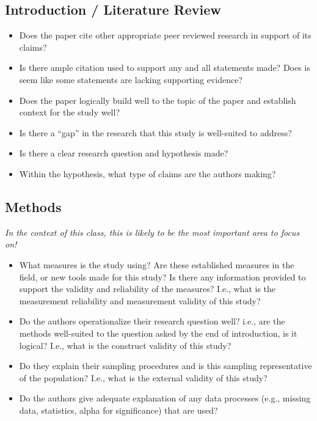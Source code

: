 \documentclass[
  12pt,
  letterpaper,
]{scrartcl}
\begin{document}
\subsection{Introduction / Literature
Review}\label{introduction-literature-review}

\begin{itemize}
\item
  Does the paper cite other appropriate peer reviewed research in
  support of its claims?
\item
  Is there ample citation used to support any and all statements made?
  Does is seem like some statements are lacking supporting evidence?
\item
  Does the paper logically build well to the topic of the paper and
  establish context for the study well?
\item
  Is there a ``gap'' in the research that this study is well-suited to
  address?
\item
  Is there a clear research question and hypothesis made?
\item
  Within the hypothesis, what type of claims are the authors making?
\end{itemize}

\subsection{Methods}\label{methods}

\emph{In the context of this class, this is likely to be the most
important area to focus on!}

\begin{itemize}
\item
  What measures is the study using? Are these established measures in
  the field, or new tools made for this study? Is there any information
  provided to support the validity and reliability of the measures?
  I.e., what is the measurement reliability and measurement validity of
  this study?
\item
  Do the authors operationalize their research question well? i.e., are
  the methods well-suited to the question asked by the end of
  introduction, is it logical? I.e., what is the construct validity of
  this study?
\item
  Do they explain their sampling procedures and is this sampling
  representative of the population? I.e., what is the external validity
  of this study?
\item
  Do the authors give adequate explanation of any data processes (e.g.,
  missing data, statistics, alpha for significance) that are used?
\end{itemize}
\end{document}
